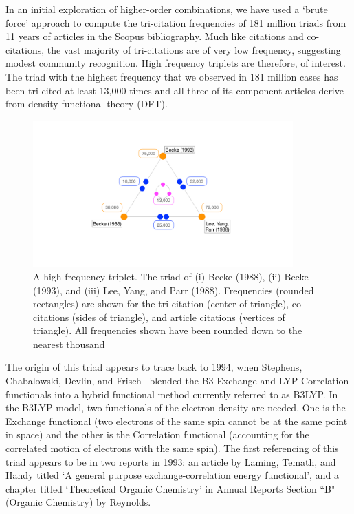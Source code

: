 \documentclass[journal=jcdis8,manuscript=article]{achemso}
\begin{document}
In an initial exploration of higher-order combinations, we have used a `brute force' approach to compute the tri-citation frequencies of 181 million triads from 11 years of articles in the Scopus bibliography.  Much like citations and co-citations, the vast majority of tri-citations are of very low frequency, suggesting modest community recognition. High frequency triplets are therefore, of interest. The triad with the highest frequency that we observed in 181 million cases has been tri-cited at least 13,000 times and all three of its component articles derive from density functional theory (DFT). 
\begin{figure}[h!]
\begin{center}
\includegraphics[width=10cm]{fig1_tricite.pdf}%
\end{center}
\caption{A high frequency triplet. The triad of (i) Becke (1988), (ii) Becke (1993), and (iii) Lee, Yang, and Parr (1988).  Frequencies (rounded rectangles) are shown for the tri-citation (center of triangle), co-citations (sides of triangle), and article citations (vertices of triangle). All frequencies shown have been rounded down to the nearest thousand
}
\label{fig:fig1}
\end{figure}

The origin of this triad appears to trace back to 1994, when Stephens, Chabalowski, Devlin, and Frisch~\citep{stephens1994ab} blended the B3 Exchange and LYP Correlation functionals into a hybrid functional method currently  referred to as B3LYP.  In the B3LYP model, two functionals of the electron density are needed. One is the Exchange functional (two electrons of the same spin cannot be at the same point in space) and the other is the Correlation functional (accounting for the correlated motion of electrons with the same spin). The first referencing of this triad appears to be in two reports in 1993: an article by Laming, Temath, and Handy\citep{laming1993} titled `A general purpose exchange‐correlation energy functional', and a chapter titled `Theoretical Organic Chemistry' in Annual Reports Section ``B" (Organic Chemistry) by Reynolds\citep{reynolds1993theoretical}.
\end{document}
